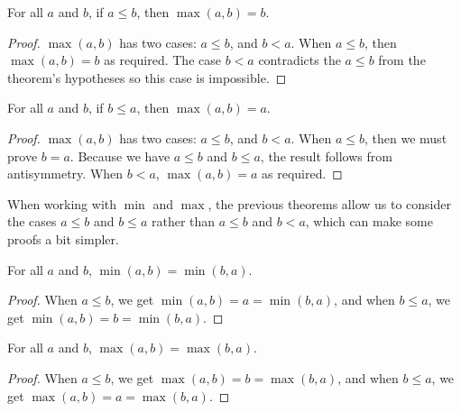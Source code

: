 \documentclass[../../math.tex]{subfiles}
\begin{document}
\begin{theorem}
    For all $a$ and $b$, if $a \leq b$, then $\max(a, b) = b$.
\end{theorem}
\begin{proof}
    $\max(a, b)$ has two cases: $a \leq b$, and $b < a$.  When $a \leq b$, then
    $\max(a, b) = b$ as required.  The case $b < a$ contradicts the $a \leq b$
    from the theorem's hypotheses so this case is impossible.
\end{proof}

\begin{theorem}
    For all $a$ and $b$, if $b \leq a$, then $\max(a, b) = a$.
\end{theorem}
\begin{proof}
    $\max(a, b)$ has two cases: $a \leq b$, and $b < a$.  When $a \leq b$, then
    we must prove $b = a$.  Because we have $a \leq b$ and $b \leq a$, the
    result follows from antisymmetry.  When $b < a$, $\max(a, b) = a$ as
    required.
\end{proof}

When working with $\min$ and $\max$, the previous theorems allow us to consider
the cases $a \leq b$ and $b \leq a$ rather than $a \leq b$ and $b < a$, which
can make some proofs a bit simpler.

\begin{theorem} \label{min_comm}
    For all $a$ and $b$, $\min(a, b) = \min(b, a)$.
\end{theorem}
\begin{proof}
    When $a \leq b$, we get $\min(a, b) = a = \min(b, a)$, and when $b \leq a$,
    we get $\min(a, b) = b = \min(b, a)$.
\end{proof}

\begin{theorem} \label{max_comm}
    For all $a$ and $b$, $\max(a, b) = \max(b, a)$.
\end{theorem}
\begin{proof}
    When $a \leq b$, we get $\max(a, b) = b = \max(b, a)$, and when $b \leq a$,
    we get $\max(a, b) = a = \max(b, a)$.
\end{proof}
\end{document}
